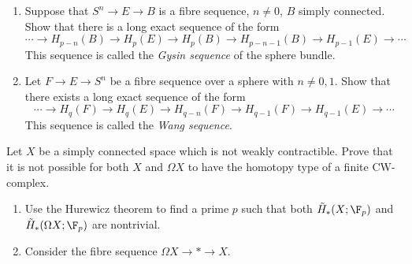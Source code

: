 \documentclass[wip, topology]{bsteffan-lecturenotes}
\begin{document}
\begin{exercise}
	\leavevmode
	\begin{enumerate}
		\item Suppose that $S^n \to E \to B$ is a fibre sequence, $n \neq 0$, $B$ simply connected.
			Show that there is a long exact sequence of the form
			\begin{equation*}
				\cdots \to H_{p - n}(B) \to H_p(E) \to H_p(B) \to H_{p - n - 1}(B) \to H_{p - 1}(E) \to \cdots
			\end{equation*}
			This sequence is called the \emph{Gysin sequence} of the sphere bundle.
		\item Let $F \to E \to S^n$ be a fibre sequence over a sphere with $n \neq 0, 1$.
			Show that there exists a long exact sequence of the form
			\begin{equation*}
				\cdots \to H_q(F) \to H_q(E) \to H_{q - n}(F) \to H_{q - 1}(F) \to H_{q - 1}(E) \to \cdots
			\end{equation*}
			This sequence is called the \emph{Wang sequence}.
	\end{enumerate}
\end{exercise}

\begin{exercise}
	Let $X$ be a simply connected space which is not weakly contractible.
	Prove that it is not possible for both $X$ and $\Omega X$ to have the homotopy type of a finite CW-complex.
	\begin{hint}
		\leavevmode
		\begin{enumerate}
			\item Use the Hurewicz theorem to find a prime $p$ such that both $\tilde{H}_*(X; \F_p)$ and $\tilde{H}_*(\Omega X; \F_p)$ are nontrivial.
			\item Consider the fibre sequence $\Omega X \to * \to X$.
		\end{enumerate}
	\end{hint}
\end{exercise}

\printbibliography
\printindex
\end{document}
